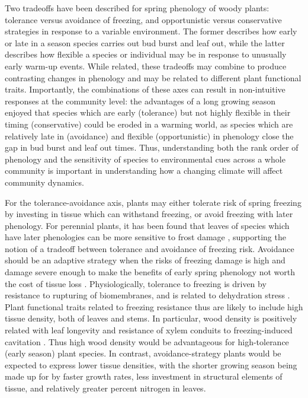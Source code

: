 \documentclass[11pt]{article}
\begin{document}
Two tradeoffs have been described for spring phenology of woody plants: tolerance versus avoidance of freezing, and opportunistic versus conservative strategies in response to a variable environment. The former describes how early or late in a season species carries out bud burst and leaf out, while the latter describes how flexible a species or individual may be in response to unusually early warm-up events. While related, these tradeoffs may combine to produce contrasting changes in phenology and may be related to different plant functional traits. Importantly, the combinations of these axes can result in non-intuitive responses at the community level: the advantages of a long growing season enjoyed that species which are early (tolerance) but not highly flexible in their timing (conservative) could be eroded in a warming world, as species which are relatively late in (avoidance) and flexible (opportunistic) in phenology close the gap in bud burst and leaf out times. Thus, understanding both the rank order of phenology and the sensitivity of species to environmental cues across a whole community is important in understanding how a changing climate will affect community dynamics.

For the tolerance-avoidance axis, plants may either tolerate risk of spring freezing by investing in tissue which can withstand freezing, or avoid freezing with later phenology. For perennial plants, it has been found that leaves of species which have later phenologies can be more sensitive to frost damage \cite{CaraDonna:2014aa}\cite{Vitasse:2014aa}, supporting the notion of a tradeoff between tolerance and avoidance of freezing risk. Avoidance should be an adaptive strategy when the risks of freezing damage is high and damage severe enough to make the benefits of early spring phenology not worth the cost of tissue loss \cite{Sakai:1987aa}. Physiologically, tolerance to freezing is driven by resistance to rupturing of biomembranes, and is related to dehydration stress \cite{Larcher:2005aa}. Plant functional traits related to freezing resistance thus are likely to include high tissue density, both of leaves and stems. In particular, wood density is positively related with leaf longevity and resistance of xylem conduits to freezing-induced cavitation \cite{Chave:2009aa}. Thus high wood density would be advantageous for high-tolerance (early season) plant species. In contrast, avoidance-strategy plants would be expected to express lower tissue densities, with the shorter growing season being made up for by faster growth rates, less investment in structural elements of tissue, and relatively greater percent nitrogen in leaves. 
\end{document}

